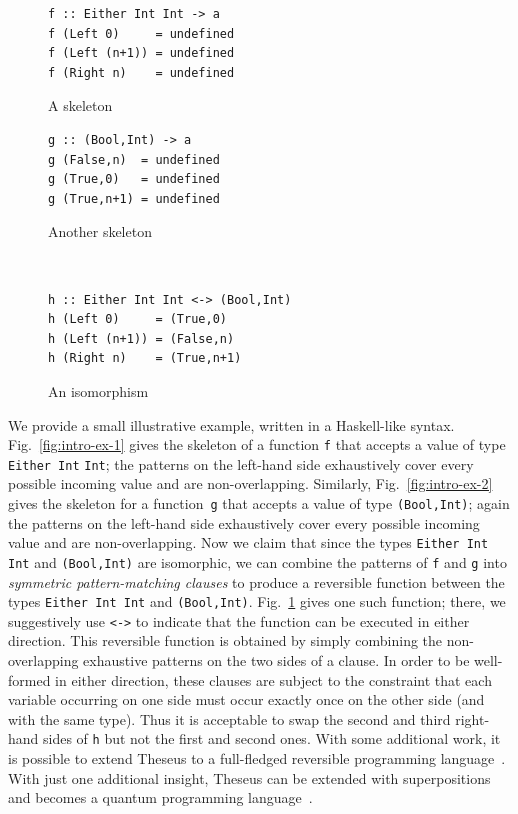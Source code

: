 \documentclass{article}
\begin{document}
\begin{figure}[t]
  \centering
  \begin{minipage}{0.4\linewidth}
    \begin{verbatim}
f :: Either Int Int -> a
f (Left 0)     = undefined
f (Left (n+1)) = undefined
f (Right n)    = undefined
\end{verbatim}\vspace{-4ex}
    \caption{A skeleton}\label{fig:intro-ex-1}
  \end{minipage}
  \hfill
  \begin{minipage}{0.4\linewidth}
\begin{verbatim}
g :: (Bool,Int) -> a
g (False,n)  = undefined
g (True,0)   = undefined
g (True,n+1) = undefined
\end{verbatim}\vspace{-4ex}
    \caption{Another skeleton}\label{fig:intro-ex-2}
  \end{minipage}
  \\[3ex]
  \begin{minipage}{0.6\linewidth}
\begin{verbatim}
h :: Either Int Int <-> (Bool,Int)
h (Left 0)     = (True,0)
h (Left (n+1)) = (False,n)
h (Right n)    = (True,n+1)
\end{verbatim}\vspace{-4ex}
    \caption{An isomorphism}\label{fig:intro-ex-3}
  \end{minipage}
\end{figure}

We provide a small illustrative example, written in a Haskell-like
syntax.  Fig.~\ref{fig:intro-ex-1} gives the skeleton of a function
\verb|f| that accepts a value of type \verb|Either Int| \verb|Int|;
the patterns on the left-hand side exhaustively cover every possible
incoming value and are non-overlapping. Similarly,
Fig.~\ref{fig:intro-ex-2} gives the skeleton for a function~\verb|g|
that accepts a value of type \verb|(Bool,Int)|; again the patterns on
the left-hand side exhaustively cover every possible incoming value
and are non-overlapping. Now we claim that since the types
\verb|Either Int Int| and \verb|(Bool,Int)| are isomorphic, we can
combine the patterns of \verb|f| and \verb|g| into \emph{symmetric
  pattern-matching clauses} to produce a reversible function between
the types \verb|Either Int Int| and
\verb|(Bool,Int)|. Fig.~\ref{fig:intro-ex-3} gives one such function;
there, we suggestively use \verb|<->| to indicate that the function
can be executed in either direction. This reversible function is
obtained by simply combining the non-overlapping exhaustive patterns
on the two sides of a clause. In order to be well-formed in either
direction, these clauses are subject to the constraint that each
variable occurring on one side must occur exactly once on the other
side (and with the same type). Thus it is acceptable to swap the
second and third right-hand sides of \verb|h| but not the first and
second ones. With some additional work, it is possible to extend
Theseus to a full-fledged reversible programming
language~\cite{theseus}. With just one additional insight, Theseus can
be extended with superpositions and becomes a quantum programming
language~\cite{10.1007/978-3-319-89366-2_19}.
\end{document}
